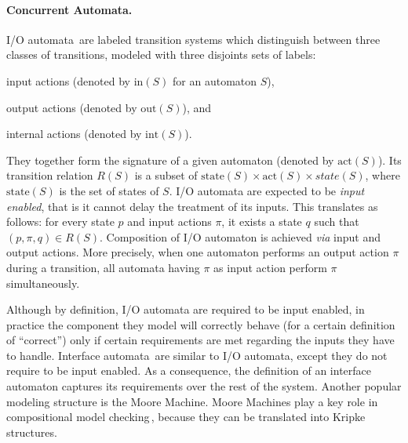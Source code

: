 \paragraph{Concurrent Automata.}
%
I/O automata\,\cite{lynch1988ioautomata} are labeled transition systems which
distinguish between three classes of transitions, modeled with three disjoints
sets of labels:
%
\begin{inparaenum}[(1)]
\item input actions (denoted by \( \mathrm{in}(S) \) for an automaton \( S \)),
\item output actions (denoted by \( \mathrm{out}(S) \)), and
\item internal actions (denoted by \( \mathrm{int}(S) \)).
\end{inparaenum}
%
They together form the signature of a given automaton (denoted by
\( \mathrm{act}(S) \)).
%
Its transition relation \( R(S) \) is a subset of
\( \mathrm{state}(S) \times \mathrm{act}(S) \times state(S) \), where
\( \mathrm{state}(S) \) is the set of states of \( S \).
%
I/O automata are expected to be \emph{input enabled}, that is it cannot delay
the treatment of its inputs.
%
This translates as follows: for every state \( p \) and input actions \( \pi \),
it exists a state \( q \) such that \( (p, \pi, q) \in R(S) \).
%
Composition of I/O automaton is achieved \emph{via} input and output actions.
%
More precisely, when one automaton performs an output action \( \pi \) during a
transition, all automata having \( \pi \) as input action perform \( \pi \)
simultaneously.

Although by definition, I/O automata are required to be input enabled, in
practice the component they model will correctly behave (for a certain
definition of ``correct'') only if certain requirements are met regarding the
inputs they have to handle.
%
Interface automata\,\cite{de2001interfaceautomata} are similar to I/O automata,
except they do not require to be input enabled.
%
As a consequence, the definition of an interface automaton captures its
requirements over the rest of the system.
%
Another popular modeling structure is the Moore Machine.
%
Moore Machines play a key role in compositional model
checking\,\cite{mcmillan1989compositional}, because they can be translated into
Kripke structures.

